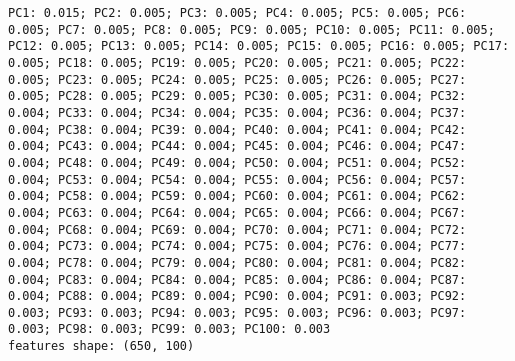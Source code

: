 \documentclass[11pt]{article}
\begin{document}
    \begin{Verbatim}[commandchars=\\\{\}]
PC1: 0.015; PC2: 0.005; PC3: 0.005; PC4: 0.005; PC5: 0.005; PC6: 0.005; PC7: 0.005; PC8: 0.005; PC9: 0.005; PC10: 0.005; PC11: 0.005; PC12: 0.005; PC13: 0.005; PC14: 0.005; PC15: 0.005; PC16: 0.005; PC17: 0.005; PC18: 0.005; PC19: 0.005; PC20: 0.005; PC21: 0.005; PC22: 0.005; PC23: 0.005; PC24: 0.005; PC25: 0.005; PC26: 0.005; PC27: 0.005; PC28: 0.005; PC29: 0.005; PC30: 0.005; PC31: 0.004; PC32: 0.004; PC33: 0.004; PC34: 0.004; PC35: 0.004; PC36: 0.004; PC37: 0.004; PC38: 0.004; PC39: 0.004; PC40: 0.004; PC41: 0.004; PC42: 0.004; PC43: 0.004; PC44: 0.004; PC45: 0.004; PC46: 0.004; PC47: 0.004; PC48: 0.004; PC49: 0.004; PC50: 0.004; PC51: 0.004; PC52: 0.004; PC53: 0.004; PC54: 0.004; PC55: 0.004; PC56: 0.004; PC57: 0.004; PC58: 0.004; PC59: 0.004; PC60: 0.004; PC61: 0.004; PC62: 0.004; PC63: 0.004; PC64: 0.004; PC65: 0.004; PC66: 0.004; PC67: 0.004; PC68: 0.004; PC69: 0.004; PC70: 0.004; PC71: 0.004; PC72: 0.004; PC73: 0.004; PC74: 0.004; PC75: 0.004; PC76: 0.004; PC77: 0.004; PC78: 0.004; PC79: 0.004; PC80: 0.004; PC81: 0.004; PC82: 0.004; PC83: 0.004; PC84: 0.004; PC85: 0.004; PC86: 0.004; PC87: 0.004; PC88: 0.004; PC89: 0.004; PC90: 0.004; PC91: 0.003; PC92: 0.003; PC93: 0.003; PC94: 0.003; PC95: 0.003; PC96: 0.003; PC97: 0.003; PC98: 0.003; PC99: 0.003; PC100: 0.003
features shape: (650, 100)

    \end{Verbatim}
\end{document}
